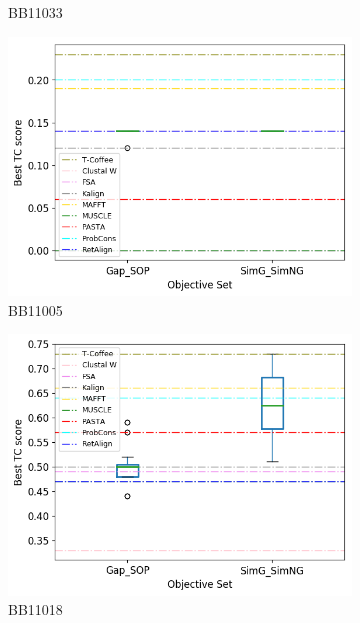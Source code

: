 \begin{figure}[!htbp]
\begin{adjustwidth}{-1cm}{-1cm}
\begin{subfigure}{0.22\textwidth}
			\caption{BB11033}
		\end{subfigure}
		\begin{subfigure}{0.22\textwidth}
			\includegraphics[width=\columnwidth]{Figure/summary/precomputedInit/Balibase/BB11005_objset_tc_rank_2}
			\caption{BB11005}
		\end{subfigure}	
		\begin{subfigure}{0.22\textwidth}
			\includegraphics[width=\columnwidth]{Figure/summary/precomputedInit/Balibase/BB11018_objset_tc_rank_2}
			\caption{BB11018}
		\end{subfigure}
		\begin{subfigure}{0.22\textwidth}

\end{subfigure}
\end{adjustwidth}
\end{figure}
